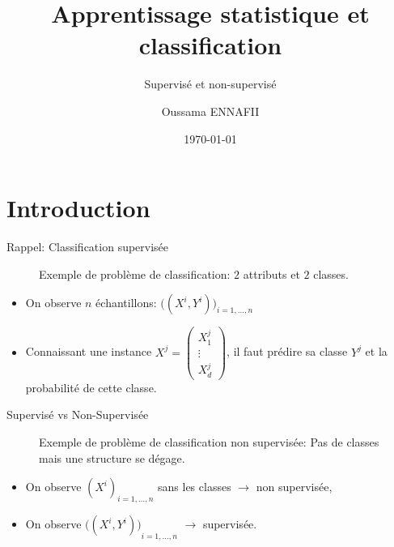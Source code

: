 \documentclass[8pt]{beamer}
\title{Apprentissage statistique et classification}
\subtitle{Supervisé et non-supervisé}
\author{Oussama ENNAFII}
\institute{ENSG}
\date{\today}
\begin{document}
	\begin{frame}[plain]
		\titlepage{}
	\end{frame}

	\section{Introduction}

		\begin{frame}{}
			
		\end{frame}

	\begin{frame}{Rappel: Classification supervisée}
		\begin{figure}[H]
			\begin{center}
				
				\caption*{\tiny Exemple de problème de classification: $2$ attributs et $2$ classes.}
			\end{center}
		\end{figure}
		\begin{itemize}
			\item <1-> On observe $n$ échantillons: $\big((X^i, Y^i)\big)_{i=1,\dots,n}$
			\item <2-> Connaissant une instance $X^j = \begin{pmatrix}
			X_1^j\\
			\vdots \\
			X_d^j
			\end{pmatrix}$, il faut prédire sa classe $Y^j$ et la probabilité de cette classe.
		\end{itemize}
	\end{frame}

	\begin{frame}{Supervisé vs Non-Supervisée}
		\begin{figure}[H]
			\begin{center}
				
				\caption*{\tiny Exemple de problème de classification non supervisée: Pas de classes mais une structure se dégage.}
			\end{center}
		\end{figure}
		\begin{itemize}
			\item <1-> On observe ${(X^i)}_{i=1,\dots,n}$ sans les classes $\longrightarrow$ non supervisée,
			\item <2-> On observe ${\big((X^i, Y^i)\big)}_{i=1,\dots,n}$ $\longrightarrow$ supervisée.
		\end{itemize}
	\end{frame}
\end{document}
